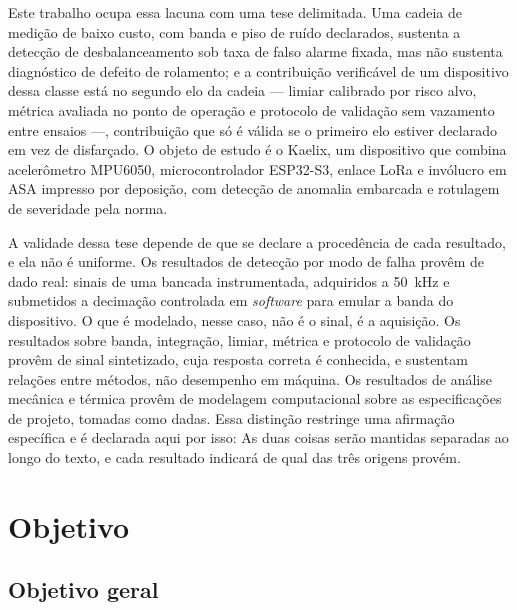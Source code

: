 Este trabalho ocupa essa lacuna com uma tese delimitada. Uma cadeia de medição de baixo
custo, com banda e piso de ruído declarados, sustenta a detecção de desbalanceamento sob taxa de falso
alarme fixada, mas não sustenta
diagnóstico de defeito de rolamento; e a contribuição verificável de um dispositivo dessa
classe está no segundo elo da cadeia --- limiar calibrado por risco alvo, métrica avaliada
no ponto de operação e protocolo de validação sem vazamento entre ensaios ---, contribuição
que só é válida se o primeiro elo estiver declarado em vez de disfarçado. O objeto de
estudo é o Kaelix, um dispositivo que combina acelerômetro MPU6050, microcontrolador
ESP32-S3, enlace LoRa e invólucro em ASA impresso por deposição, com detecção de anomalia
embarcada e rotulagem de severidade pela norma.

A validade dessa tese depende de que se declare a procedência de cada resultado, e ela não
é uniforme. Os resultados de detecção por modo de falha provêm de dado real: sinais de uma
bancada instrumentada, adquiridos a \SI{50}{\kilo\hertz} e submetidos a decimação
controlada em \emph{software} para emular a banda do dispositivo. O que é modelado, nesse
caso, não é o sinal, é a aquisição. Os resultados sobre banda, integração, limiar, métrica e
protocolo de validação provêm de sinal sintetizado, cuja resposta correta é conhecida, e
sustentam relações entre métodos, não desempenho em máquina. Os resultados de análise
mecânica e térmica provêm de modelagem computacional sobre as especificações de projeto,
tomadas como dadas.  Essa distinção restringe uma afirmação
específica e é declarada aqui por isso:  As duas coisas serão mantidas separadas ao
longo do texto, e cada resultado indicará de qual das três origens provém.

\section{Objetivo}
\label{sec:objetivo}

\subsection{Objetivo geral}
\label{ssec:objetivo-geral}

